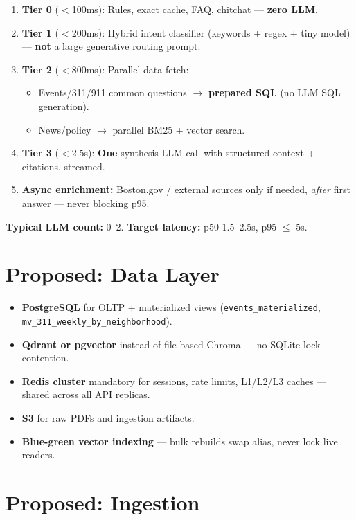 \documentclass[11pt,a4paper]{article}
\begin{document}
\begin{enumerate}
  \item \textbf{Tier 0} ($<$100ms): Rules, exact cache, FAQ, chitchat --- \textbf{zero LLM}.
  \item \textbf{Tier 1} ($<$200ms): Hybrid intent classifier (keywords + regex + tiny model) --- \textbf{not} a large generative routing prompt.
  \item \textbf{Tier 2} ($<$800ms): Parallel data fetch:
  \begin{itemize}
    \item Events/311/911 common questions $\rightarrow$ \textbf{prepared SQL} (no LLM SQL generation).
    \item News/policy $\rightarrow$ parallel BM25 + vector search.
  \end{itemize}
  \item \textbf{Tier 3} ($<$2.5s): \textbf{One} synthesis LLM call with structured context + citations, streamed.
  \item \textbf{Async enrichment:} Boston.gov / external sources only if needed, \emph{after} first answer --- never blocking p95.
\end{enumerate}

\textbf{Typical LLM count:} 0--2. \textbf{Target latency:} p50 1.5--2.5s, p95 $\leq$ 5s.

\section{Proposed: Data Layer}

\begin{itemize}
  \item \textbf{PostgreSQL} for OLTP + materialized views (\texttt{events\_materialized}, \texttt{mv\_311\_weekly\_by\_neighborhood}).
  \item \textbf{Qdrant or pgvector} instead of file-based Chroma --- no SQLite lock contention.
  \item \textbf{Redis cluster} mandatory for sessions, rate limits, L1/L2/L3 caches --- shared across all API replicas.
  \item \textbf{S3} for raw PDFs and ingestion artifacts.
  \item \textbf{Blue-green vector indexing} --- bulk rebuilds swap alias, never lock live readers.
\end{itemize}

\section{Proposed: Ingestion}
\end{document}
